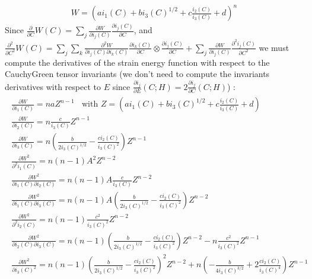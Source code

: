 \documentclass[a4paper,11pt,english]{sphinxmanual}
\begin{document}
\subsubsection{}
\label{\detokenize{userdoc/model_nonlinear_elasticity:generalized-blatz-ko-law}}\begin{equation*}
\begin{split}{W} = (a i_1(C) + b i_3(C)^{1/2} + c\frac{i_2(C)}{i_3(C)} + d)^n\end{split}
\end{equation*}
Since \(\frac{\partial}{\partial C} {W}(C) = \displaystyle\sum_{j}\frac{\partial W}{\partial i_j(C)} \frac{\partial i_j(C)}{\partial C}\), and \(\frac{\partial^2}{\partial C^2} {W}(C) = \displaystyle\sum_{j} \displaystyle\sum_{k} \frac{\partial^2 W}{\partial i_j(C) \partial i_k(C)} \frac{\partial i_k(C)}{\partial C} \otimes \frac{\partial i_j(C)}{\partial C} + \displaystyle\sum_{j} \frac{\partial W}{\partial i_j(C)} \frac{\partial^2 i_j(C)}{\partial C^2}\) we must compute the derivatives of the strain energy function with respect to the Cauchy\sphinxhyphen{}Green tensor invariants (we don’t need to compute the invariants derivatives with respect to \(E\) since \(\frac{\partial i_j}{\partial E}(C;H) = 2 \frac{\partial i_j}{\partial C}(C;H)\)) :
\begin{equation*}
\begin{split}\begin{array}{l}
\frac{\partial W}{\partial i_1(C)} = naZ^{n-1}
~~~~\mbox{with } Z = (a i_1(C) + b i_3(C)^{1/2} + c\frac{i_2(C)}{i_3(C)} + d)\\
\frac{\partial W}{\partial i_2(C)} = n\frac{c}{i_3(C)}Z^{n-1}\\
\frac{\partial W}{\partial i_3(C)} = n(\frac{b}{2i_3(C)^{1/2}}-\frac{ci_2(C)}{i_3(C)^2})Z^{n-1}\\
\frac{\partial W^2}{\partial^2 i_1(C)} = n(n-1)A^2Z^{n-2}\\
\frac{\partial W^2}{\partial i_1(C) \partial i_2(C)} = n(n-1)A\frac{c}{i_3(C)}Z^{n-2}\\
\frac{\partial W^2}{\partial i_1(C) \partial i_3(C)} = n(n-1)A(\frac{b}{2i_3(C)^{1/2}}-\frac{ci_2(C)}{i_3(C)^2})Z^{n-2}\\
\frac{\partial W^2}{\partial^2 i_2(C)} = n(n-1)\frac{c^2}{i_3(C)^2}Z^{n-2}\\
\frac{\partial W^2}{\partial i_2(C) \partial i_3(C)} = n(n-1)(\frac{b}{2i_3(C)^{1/2}}-\frac{ci_2(C)}{i_3(C)^2})Z^{n-2} - n\frac{c^2}{i_3(C)^2}Z^{n-1}\\
\frac{\partial W^2}{\partial i_3(C)^2} = n(n-1)(\frac{b}{2i_3(C)^{1/2}}-\frac{ci_2(C)}{i_3(C)^2})^2Z^{n-2} + n(-\frac{b}{4i_3(C)^{3/2}}+2\frac{ci_2(C)}{i_3(C)^4})Z^{n-1}
\end{array}\end{split}
\end{equation*}
\end{document}
